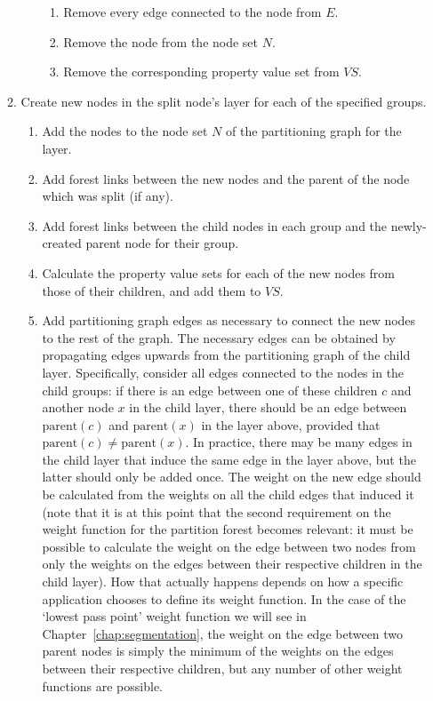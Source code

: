 \begin{itemize}
\begin{enumerate}
\begin{enumerate}
\begin{enumerate}

\item Remove every edge connected to the node from $E$.
\item Remove the node from the node set $N$.
\item Remove the corresponding property value set from $\textit{VS}$.

\end{enumerate}

\end{enumerate}

\item Create new nodes in the split node's layer for each of the specified groups.

\begin{enumerate}

\item Add the nodes to the node set $N$ of the partitioning graph for the layer.
\item Add forest links between the new nodes and the parent of the node which was split (if any).
\item Add forest links between the child nodes in each group and the newly-created parent node for their group.
\item Calculate the property value sets for each of the new nodes from those of their children, and add them to $\textit{VS}$.
\item Add partitioning graph edges as necessary to connect the new nodes to the rest of the graph. The necessary edges can be obtained by propagating edges upwards from the partitioning graph of the child layer. Specifically, consider all edges connected to the nodes in the child groups: if there is an edge between one of these children $c$ and another node $x$ in the child layer, there should be an edge between $\mbox{parent}(c)$ and $\mbox{parent}(x)$ in the layer above, provided that $\mbox{parent}(c) \ne \mbox{parent}(x)$. In practice, there may be many edges in the child layer that induce the same edge in the layer above, but the latter should only be added once. The weight on the new edge should be calculated from the weights on all the child edges that induced it (note that it is at this point that the second requirement on the weight function for the partition forest becomes relevant: it must be possible to calculate the weight on the edge between two nodes from only the weights on the edges between their respective children in the child layer). How that actually happens depends on how a specific application chooses to define its weight function. In the case of the `lowest pass point' weight function we will see in Chapter~\ref{chap:segmentation}, the weight on the edge between two parent nodes is simply the minimum of the weights on the edges between their respective children, but any number of other weight functions are possible.


\end{enumerate}
\end{enumerate}
\end{itemize}
